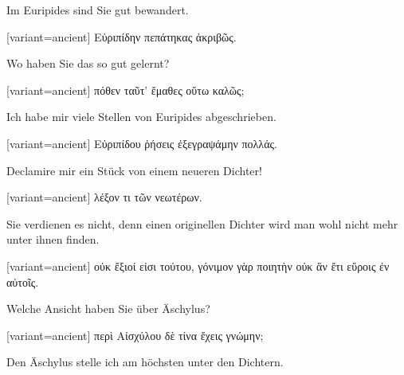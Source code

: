 Im Euripides sind Sie gut bewandert. 

\switchcolumn

\begin{greek}[variant=ancient]%
Εὐριπίδην πεπάτηκας ἀκριβῶς.

\end{greek}%
\switchcolumn*

Wo haben Sie das so gut gelernt? 

\switchcolumn

\begin{greek}[variant=ancient]%
πόθεν ταῦτ' ἔμαθες οὕτω καλῶς;

\end{greek}%
\switchcolumn*

Ich habe mir viele Stellen von Euripides abgeschrieben. 

\switchcolumn

\begin{greek}[variant=ancient]%
Εὐριπίδου ῥήσεις ἐξεγραψάμην πολλάς.

\end{greek}%
\switchcolumn*

Declamire mir ein Stück von einem neueren Dichter! 

\switchcolumn

\begin{greek}[variant=ancient]%
λέξον τι τῶν νεωτέρων.

\end{greek}%
\switchcolumn*

Sie verdienen es nicht, denn einen originellen Dichter wird man wohl
nicht mehr unter ihnen finden. 

\switchcolumn

\begin{greek}[variant=ancient]%
οὐκ ἔξιοί εἰσι τούτου, γόνιμον γὰρ ποιητὴν οὐκ ἂν ἔτι εὕροις ἐν αὐτοῖς.

\end{greek}%
\switchcolumn*

Welche Ansicht haben Sie über Äschylus? 

\switchcolumn

\begin{greek}[variant=ancient]%
περὶ Αἰσχύλου δὲ τίνα ἔχεις γνώμην;

\end{greek}%
\switchcolumn*

Den Äschylus stelle ich am höchsten unter den Dichtern. 

\switchcolumn

